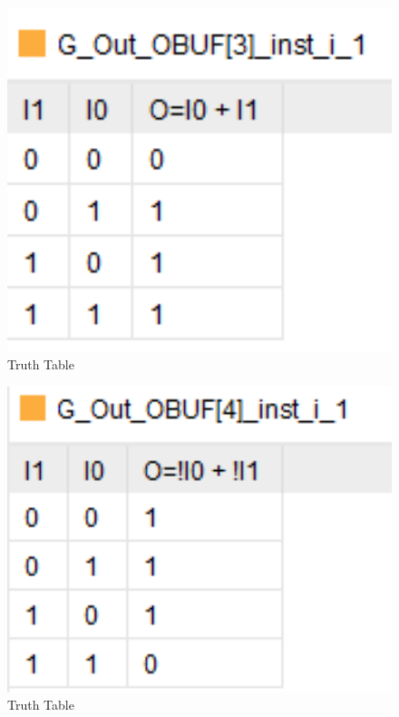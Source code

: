 \documentclass{article}
\begin{document}
\begin{figure}[h]
\begin{center}
\includegraphics[width=1\textwidth]{GatesTruthTableCont1.png} %
\caption{Truth Table}
\end{center}
\end{figure}

\begin{figure}[h]
\begin{center}
\includegraphics[width=1\textwidth]{GatesTruthTableCont2.png} %
\caption{Truth Table}
\end{center}
\end{figure}
\end{document}
